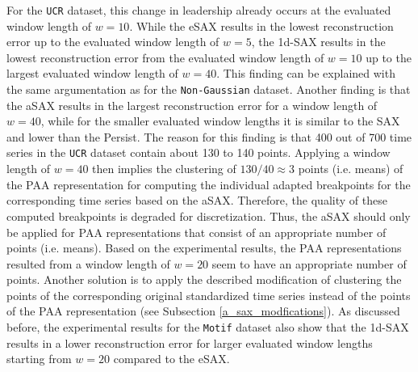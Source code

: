 For the \texttt{UCR} dataset, this change in leadership already occurs at the evaluated window length of $w = 10$. While the \ac{eSAX} results in the lowest reconstruction error up to the evaluated window length of $w = 5$, the \ac{1d-SAX} results in the lowest reconstruction error from the evaluated window length of $w = 10$ up to the largest evaluated window length of $w = 40$. This finding can be explained with the same argumentation as for the \texttt{Non-Gaussian} dataset. Another finding is that the \ac{aSAX} results in the largest reconstruction error for a window length of $w = 40$, while for the smaller evaluated window lengths it is similar to the \ac{SAX} and lower than the Persist. The reason for this finding is that 400 out of 700 time series in the \texttt{UCR} dataset contain about 130 to 140 points. Applying a window length of $w = 40$ then implies the clustering of $130 / 40 \approx 3$ points (i.e. means) of the \ac{PAA} representation for computing the individual adapted breakpoints for the corresponding time series based on the \ac{aSAX}. Therefore, the quality of these computed breakpoints is degraded for discretization. Thus, the \ac{aSAX} should only be applied for \ac{PAA} representations that consist of an appropriate number of points (i.e. means). Based on the experimental results, the \ac{PAA} representations resulted from a window length of $w = 20$ seem to have an appropriate number of points. Another solution is to apply the described modification of clustering the points of the corresponding original standardized time series instead of the points of the \ac{PAA} representation (see Subsection \ref{a_sax_modfications}). \newline
As discussed before, the experimental results for the \texttt{Motif} dataset also show that the \ac{1d-SAX} results in a lower reconstruction error for larger evaluated window lengths starting from $w = 20$ compared to the \ac{eSAX}. \newline
